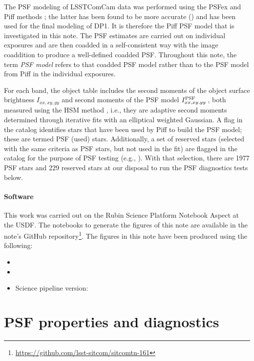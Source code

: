 \documentclass[SE,lsstdraft,authoryear,toc]{lsstdoc}
\begin{document}
The PSF modeling of LSSTComCam data was performed using the PSFex \citep{2011ASPC..442..435B} and Piff methods \citep{2021MNRAS.501.1282J}; the latter has been found to be more accurate () and has been used for the final modeling of DP1. It is therefore the Piff PSF model that is investigated in this note. The PSF estimates are carried out on individual exposures and are then coadded in a self-consistent way with the image coaddition to produce a well-defined coadded PSF. Throughout this note, the term \emph{PSF model} refers to that coadded PSF model rather than to the PSF model from Piff in the individual exposures. 

For each band, the object table includes the second moments of the object surface brightness $I_{xx,xy,yy}$ and second moments of the PSF model $I_{xx,xy,yy}^{\rm PSF}\,$, both measured using the HSM method \citep{2003MNRAS.343..459H, 2005MNRAS.361.1287M, 2018MNRAS.481.3170M}, i.e., they are adaptive second moments determined through iterative fits with an elliptical weighted Gaussian. A flag in the catalog identifies stars that have been used by Piff to build the PSF model; these are termed PSF (used) stars. Additionally, a set of reserved stars (selected with the same criteria as PSF stars, but not used in the fit) are flagged in the catalog for the purpose of PSF testing (e.g., \citealp{2025OJAp....8E..26S}). With that selection, there are 1977 PSF stars and 229 reserved stars at our disposal to run the PSF diagnostics tests below. 

\paragraph*{Software} This work was carried out on the Rubin Science Platform Notebook Aspect at the USDF. The notebooks to generate the figures of this note are available in the note's GitHub repository\footnote{\url{https://github.com/lsst-sitcom/sitcomtn-161}}.
The figures in this note have been produced using the following:
\begin{itemize}
\item {}
\item {}
\item Science pipeline version: 
\end{itemize}


\section{PSF properties and diagnostics}
\label{sec:tests}
\end{document}

